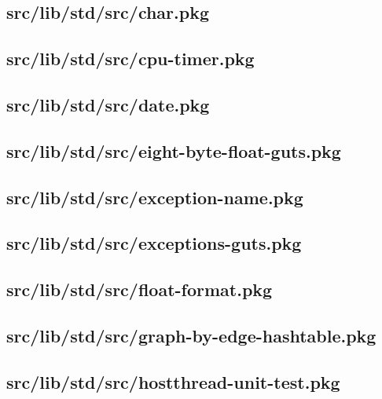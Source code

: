 \subsection{src/lib/std/src/char.pkg}


\subsection{src/lib/std/src/cpu-timer.pkg}


\subsection{src/lib/std/src/date.pkg}


\subsection{src/lib/std/src/eight-byte-float-guts.pkg}


\subsection{src/lib/std/src/exception-name.pkg}


\subsection{src/lib/std/src/exceptions-guts.pkg}


\subsection{src/lib/std/src/float-format.pkg}


\subsection{src/lib/std/src/graph-by-edge-hashtable.pkg}


\subsection{src/lib/std/src/hostthread-unit-test.pkg}


